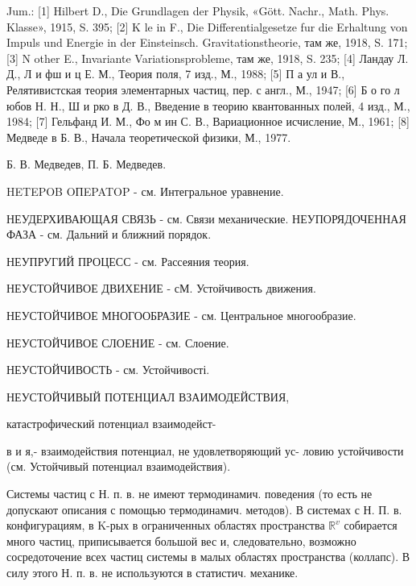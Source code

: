 \documentclass[10pt]{article}
\begin{document}
Jum.: [1] Hilbert D., Die Grundlagen der Physik, «Gött. Nachr., Math. Phys. Klasse», 1915, S. 395; [2] K le in F., Die Differentialgesetze fur die Erhaltung von Impuls und Energie in der Einsteinsch. Gravitationstheorie, там же, 1918, S. 171; [3] N other E., Invariante Variationsprobleme, там же, 1918, S. 235; [4] Ландау Л. Д., Л и фш и ц Е. М., Теория поля, 7 изд., М., 1988; [5] П а ул и В., Релятивистская теория элементарных частиц, пер. с англ., М., 1947; [6] Б о го л юбов Н. Н., Ш и рко в Д. В., Введение в теорию квантованных полей, 4 изд., М., 1984; [7] Гельфанд И. М., Фо м ин С. В., Вариационное исчисление, М., 1961; [8] Медведе в Б. В., Начала теоретической физики, М., 1977.



Б. В. Медведев, П. Б. Медведев.



HETEPOB OПEPATOP - см. Интегральное уравнение.



НЕУДЕРХИВАЮЩАЯ СВЯЗЬ - см. Связи механические. НЕУПОРЯДОЧЕННАЯ ФАЗА - см. Дальний $и$ ближний порядок.



НЕУПРУГИЙ ПРОЦЕСС - см. Рассеяния теория.



НЕУСТОЙЧИВОЕ ДВИХЕНИЕ - сМ. Устойчивость движения.



НЕУСТОЙЧИВОЕ МНОГООБРАЗИЕ - см. Центральное многообразие.



НЕУСТОЙЧИВОЕ СЛОЕНИЕ - см. Слоение.



НЕУСТОЙЧИВОСТЬ - см. Устойчивості.



НЕУСТОЙЧИВЫЙ ПОТЕНЦИАЛ ВЗАИМОДЕЙСТВИЯ,



катастрофический потенциал взаимодейст-



в и я,- взаимодействия потенциал, не удовлетворяющий ус- ловию устойчивости (см. Устойчивый потенциал взаимодействия).



Системы частиц с Н. п. в. не имеют термодинамич. поведения (то есть не допускают описания с помощью термодинамич. методов). В системах с Н. П. в. конфигурациям, в K-рых в ограниченных областях пространства $\mathbb{R}^{v}$ собирается много частиц, приписывается большой вес и, следовательно, возможно сосредоточение всех частиц системы в малых областях пространства (коллапс). В силу этого Н. п. в. не используются в статистич. механике.
\end{document}
